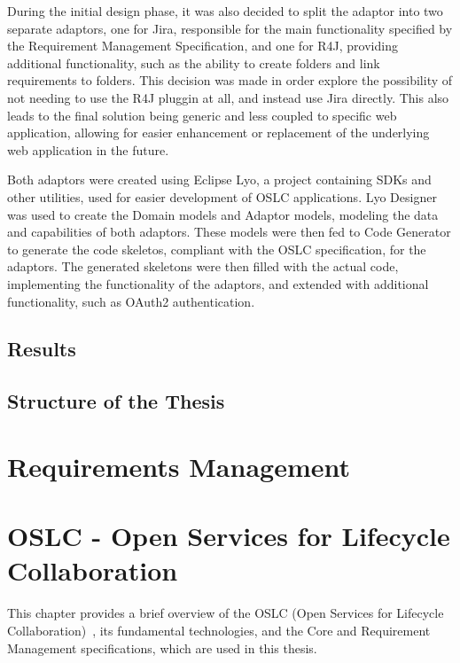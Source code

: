 During the initial design phase, it was also decided to split the adaptor into two separate adaptors, one for Jira, responsible for the main functionality specified by the Requirement Management Specification, and one for R4J, providing additional functionality, such as the ability to create folders and link requirements to folders. This decision was made in order explore the possibility of not needing to use the R4J pluggin at all, and instead use Jira directly. This also leads to the final solution being generic and less coupled to specific web application, allowing for easier enhancement or replacement of the underlying web application in the future.

Both adaptors were created using Eclipse Lyo, a project containing SDKs and other utilities, used for easier development of OSLC applications. Lyo Designer was used to create the Domain models and Adaptor models, modeling the data and capabilities of both adaptors. These models were then fed to Code Generator to generate the code skeletos, compliant with the OSLC specification, for the adaptors. The generated skeletons were then filled with the actual code, implementing the functionality of the adaptors, and extended with additional functionality, such as OAuth2 authentication.

\section{Results}

\section{Structure of the Thesis}


\chapter{Requirements Management}


\chapter{OSLC - Open Services for Lifecycle Collaboration}
This chapter provides a brief overview of the OSLC (Open Services for Lifecycle Collaboration) \cite{oslc}, its fundamental technologies, and the Core and Requirement Management specifications, which are used in this thesis.

